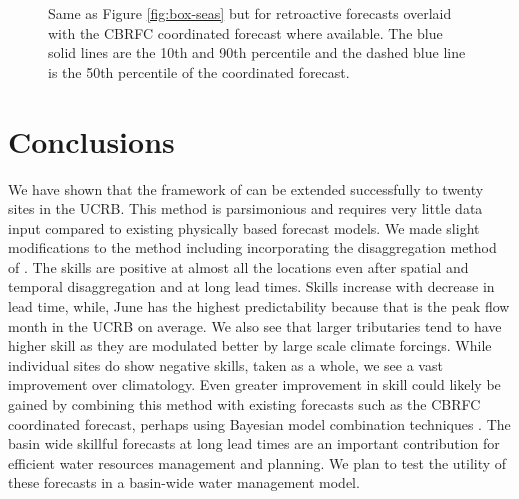 \documentclass[final,5p,times,twocolumn,authoryear]{elsarticle}
\begin{document}
\begin{figure*}[htbp] %
   \centering
    
   \caption{Same as Figure \ref{fig:box-seas} but for retroactive forecasts overlaid with the CBRFC coordinated forecast where available. The blue solid lines are the 10th and 90th percentile and the dashed blue line is the 50th percentile of the coordinated forecast.}
   \label{fig:box-retro}
\end{figure*}
 
%
 
\section{Conclusions}

We have shown that the framework of \cite{Bracken:2010cw} can be extended successfully to twenty sites in the UCRB. This method is parsimonious and requires very little data input compared to existing physically based forecast models.  We made slight modifications to the method including incorporating the disaggregation method of \cite{Nowak:2010ha}. The skills are positive at almost all the locations even after spatial and temporal disaggregation and at long lead times. Skills increase with decrease in lead time, while, June has the highest predictability because that is the peak flow month in the UCRB on average. We also see that larger tributaries tend to have higher skill as they are modulated better by large scale climate forcings. While individual sites do show negative skills, taken as a whole, we see a vast improvement over climatology. Even greater improvement in skill could likely be gained by combining this method with existing forecasts such as the CBRFC coordinated forecast, perhaps using Bayesian model combination techniques \citep{Rajagopalan2002, Raftery:2005un, Duan:2007ts}.  The basin wide skillful forecasts at long lead times are an important contribution for efficient water resources management and planning. We plan to test the utility of these forecasts in a basin-wide water management model. 

\newpage



\end{document}
